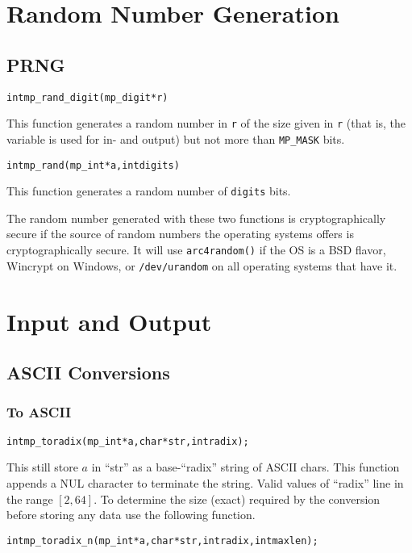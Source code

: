 \documentclass[synpaper]{book}
\begin{document}
\chapter{Random Number Generation}
\section{PRNG}
\begin{alltt}
int mp_rand_digit(mp_digit *r)
\end{alltt}
This function generates a random number in \texttt{r} of the size given in \texttt{r} (that is, the variable is used for in- and output) but not more than \texttt{MP\_MASK} bits.

\begin{alltt}
int mp_rand(mp_int *a, int digits)
\end{alltt}
This function generates a random number of \texttt{digits} bits.

The random number generated with these two functions is cryptographically secure if the source of random numbers the operating systems offers is cryptographically secure. It will use \texttt{arc4random()} if the OS is a BSD flavor, Wincrypt on Windows, or \texttt{/dev/urandom} on all operating systems that have it.


\chapter{Input and Output}
\section{ASCII Conversions}
\subsection{To ASCII}
\begin{alltt}
int mp_toradix (mp_int * a, char *str, int radix);
\end{alltt}
This still store $a$ in ``str'' as a base-``radix'' string of ASCII chars.  This function appends a NUL character
to terminate the string.  Valid values of ``radix'' line in the range $[2, 64]$.  To determine the size (exact) required
by the conversion before storing any data use the following function.

\begin{alltt}
int mp_toradix_n (mp_int * a, char *str, int radix, int maxlen);
\end{alltt}
\end{document}
